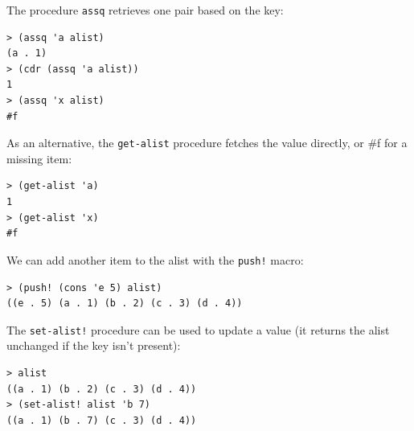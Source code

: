 \documentclass[twoside,9pt]{report}
\begin{document}
{The procedure \texttt{assq} retrieves one pair based on the key:

\noindent\makebox[\linewidth]{\rule{\linewidth}{0.4pt}}
\begin{lstlisting}
> (assq 'a alist)
(a . 1)
> (cdr (assq 'a alist))
1
> (assq 'x alist)
#f
\end{lstlisting}
\noindent\makebox[\linewidth]{\rule{\linewidth}{0.4pt}}

As an alternative, the \texttt{get-alist} procedure fetches the value directly, or \#f for a missing item:

\noindent\makebox[\linewidth]{\rule{\linewidth}{0.4pt}}
\begin{lstlisting}
> (get-alist 'a)
1
> (get-alist 'x)
#f
\end{lstlisting}
\noindent\makebox[\linewidth]{\rule{\linewidth}{0.4pt}}

We can add another item to the alist with the \texttt{push!} macro:

\noindent\makebox[\linewidth]{\rule{\linewidth}{0.4pt}}
\begin{lstlisting}
> (push! (cons 'e 5) alist)
((e . 5) (a . 1) (b . 2) (c . 3) (d . 4))
\end{lstlisting}
\noindent\makebox[\linewidth]{\rule{\linewidth}{0.4pt}}

The \texttt{set-alist!} procedure can be used to update a value (it returns the alist unchanged if the key isn't present):

\noindent\makebox[\linewidth]{\rule{\linewidth}{0.4pt}}
\begin{lstlisting}
> alist
((a . 1) (b . 2) (c . 3) (d . 4))
> (set-alist! alist 'b 7)
((a . 1) (b . 7) (c . 3) (d . 4))
\end{lstlisting}
\noindent\makebox[\linewidth]{\rule{\linewidth}{0.4pt}}

}
\end{document}
